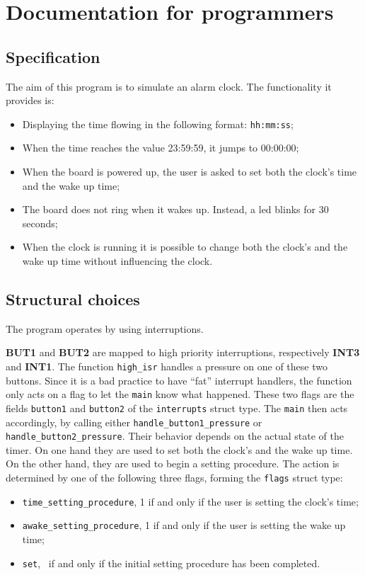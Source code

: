 \section{Documentation for programmers}
\subsection{Specification}
The aim of this program is to simulate an alarm clock. The functionality it provides is:
\begin{itemize}
	\item Displaying the time flowing in the following format: \texttt{hh:mm:ss};
	\item When the time reaches the value 23:59:59, it jumps to 00:00:00;
	\item When the board is powered up, the user is asked to set both the clock's time and the wake up time;
	\item The board does not ring when it wakes up. Instead, a led blinks for 30 seconds;
	\item When the clock is running it is possible to change both the clock's and the wake up time without influencing the clock.
\end{itemize}

\subsection{Structural choices}
The program operates by using interruptions. 

\textbf{BUT1} and \textbf{BUT2} are mapped to high priority interruptions, respectively \textbf{INT3} and \textbf{INT1}. The function \texttt{high\_isr} handles a pressure on one of these two buttons. Since it is a bad practice to have ``fat'' interrupt handlers, the function only acts on a flag to let the \texttt{main} know what happened. These two flags are the fields \texttt{button1} and \texttt{button2} of the \texttt{interrupts} struct type. The \texttt{main} then acts accordingly, by calling either \texttt{handle\_button1\_pressure} or \texttt{handle\_button2\_pressure}. Their behavior depends on the actual state of the timer. On one hand they are used to set both the clock's and the wake up time. On the other hand, they are used to begin a setting procedure. The action is determined by one of the following three flags, forming the \texttt{flags} struct type:
\begin{itemize}
	\item \texttt{time\_setting\_procedure}, 1 if and only if the user is setting the clock's time;
	\item \texttt{awake\_setting\_procedure}, 1 if and only if the user is setting the wake up time;
	\item \texttt{set}, \ if and only if the initial setting procedure has been completed.
\end{itemize}

